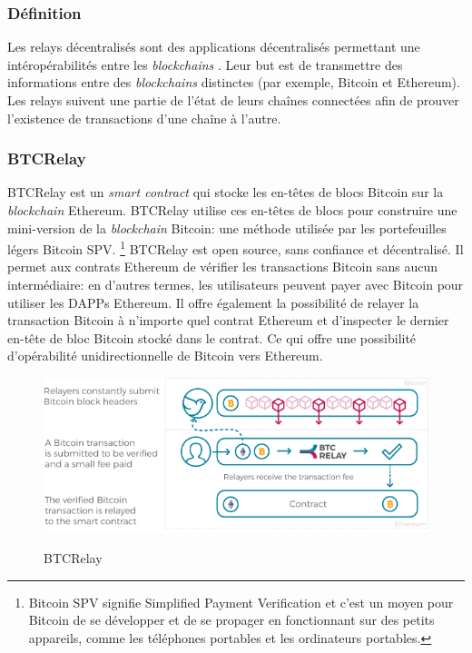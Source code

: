 \subsubsection{Définition}
Les relays décentralisés sont des applications décentralisés permettant une intéropérabilités entre les \textit{blockchains} \cite{qin2018overview, westerkamp2022verilay,belchior2022survey}.
Leur but est de transmettre des informations entre des \textit{blockchains} distinctes (par exemple, Bitcoin et Ethereum). 
Les relays suivent une partie de l’état de leurs chaînes connectées afin de prouver l’existence de transactions d’une chaîne à l’autre.

\subsubsection{BTCRelay}
BTCRelay est un \textit{smart contract} qui stocke les en-têtes de blocs Bitcoin sur la \textit{blockchain} Ethereum. \cite{qin2018overview,belchior2022survey,btcrelay2022web,btcrelay2022git}
BTCRelay utilise ces en-têtes de blocs pour construire une mini-version de la \textit{blockchain} Bitcoin: une méthode utilisée par les 
portefeuilles légers Bitcoin SPV. \footnote{Bitcoin SPV signifie Simplified Payment Verification et c’est un moyen pour Bitcoin de se 
développer et de se propager en fonctionnant sur des petits appareils, comme les téléphones portables et les ordinateurs portables.}
BTCRelay est open source, sans confiance et décentralisé. Il permet aux contrats Ethereum de vérifier les transactions Bitcoin sans aucun 
intermédiaire: en d’autres termes, les utilisateurs peuvent payer avec Bitcoin pour utiliser les DAPPs Ethereum. Il offre également la 
possibilité de relayer la transaction Bitcoin à n’importe quel contrat Ethereum et d’inspecter le dernier en-tête de bloc Bitcoin stocké 
dans le contrat. Ce qui offre une possibilité d'opérabilité unidirectionnelle de Bitcoin vers Ethereum.\\

\begin{figure}[h!]
  \centering
  \includegraphics[scale=0.5]{decentralisation/btcRelay.png}
  \label{fig:btcRelay}
  \caption{BTCRelay}
\end{figure}

